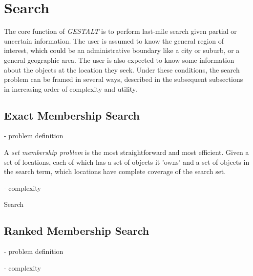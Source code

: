 \section{Search}
\label{section:search}

The core function of \textit{GESTALT} is to perform last-mile search given partial or uncertain information.
The user is assumed to know the general region of interest, which could be an administrative boundary like a city or suburb, or a general geographic area.
The user is also expected to know some information about the objects at the location they seek.
Under these conditions, the search problem can be framed in several ways, described in the subsequent subsections in increasing order of complexity and utility.





\subsection{Exact Membership Search}
- problem definition

A \textit{set membership problem} is the most straightforward and most efficient. Given a set of locations, each of which has a set of objects it 'owns' and a set of objects in the search term, which locations have complete coverage of the search set.

- complexity

\begin{algorithm}
    \caption{Search}\label{alg:search}
    \begin{algorithmic}
        \State{- - - - -}
            \EndFor
            \EndProcedure
    \end{algorithmic}
\end{algorithm}


\subsection{Ranked Membership Search}
- problem definition

- complexity

